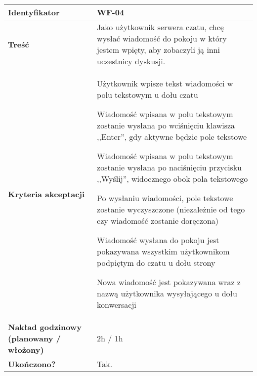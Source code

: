 \begin{tabular}{ | l | l | }
	\hline
		\textbf{Identyfikator} &
		WF-04
		\\

	\hline
		\textbf{Treść} & \parbox[t]{11.5cm}{\strut
			Jako użytkownik serwera czatu, chcę wysłać
			wiadomość do pokoju w który jestem wpięty, aby
			zobaczyli ją inni uczestnicy dyskusji.
		\strut}\\

	\hline
		\parbox[t]{4cm}{\textbf{Kryteria akceptacji}} & \parbox[t]{11.5cm}{\strut
			\begin{enumreq}
				\item Użytkownik wpisze tekst wiadomości w polu
				tekstowym u dołu czatu
				\item Wiadomość wpisana w polu tekstowym zostanie
				wysłana po wciśnięciu klawisza ,,Enter'', gdy aktywne
				będzie pole tekstowe
				\item Wiadomość wpisana w polu tekstowym zostanie
				wysłana po naciśnięciu przycisku ,,Wyślij'',
				widocznego obok pola tekstowego
				\item Po wysłaniu wiadomości, pole tekstowe zostanie
				wyczyszczone (niezależnie od tego czy wiadomość
				zostanie doręczona)
				\item Wiadomość wysłana do pokoju jest pokazywana
				wszystkim użytkownikom podpiętym do czatu u dołu
				strony
				\item Nowa wiadomość jest pokazywana wraz z nazwą
				użytkownika wysyłającego u dołu konwersacji
			\end{enumreq}
			\strut}
		\\

    \hline
      \parbox[t]{4cm}{\textbf{Nakład godzinowy (planowany / włożony)}} &
      \parbox[t]{11.5cm}{\strut
        2h / 1h
      \strut}\\
	\hline

    \parbox[t]{4cm}{\textbf{Ukończono?}} &
    \parbox[t]{11.5cm}{\strut
      Tak.
    \strut}\\

    \hline
\end{tabular}

\vspace{1em}

